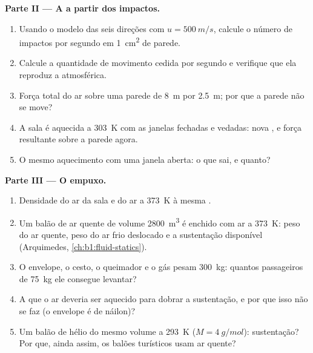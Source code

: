 \begin{problem}
\medskip
\noindent\textbf{Parte II --- A  a partir dos impactos.}
\begin{enumerate}[resume]
  \item Usando o modelo das seis direções com $u = \qty{500}{m/s}$, calcule
        o número de impactos por segundo em \qty{1}{cm^2} de parede.
  \item Calcule a quantidade de movimento cedida por segundo e verifique
        que ela reproduz a  atmosférica.
  \item Força total do ar sobre uma parede de \qty{8}{m} por \qty{2.5}{m};
        por que a parede não se move?
  \item A sala é aquecida a \qty{303}{K} com as janelas fechadas e vedadas:
        nova , e força resultante sobre a parede agora.
  \item O mesmo aquecimento com uma janela aberta: o que sai, e quanto?
\end{enumerate}

\medskip
\noindent\textbf{Parte III --- O empuxo.}
\begin{enumerate}[resume]
  \item Densidade do ar da sala e do ar a \qty{373}{K} à mesma .
  \item Um balão de ar quente de volume \qty{2800}{m^3} é enchido com ar a
        \qty{373}{K}: peso do ar quente, peso do ar frio deslocado e a
        sustentação disponível (Arquimedes,
        \cref{ch:b1:fluid-statics}).
  \item O envelope, o cesto, o queimador e o gás pesam \qty{300}{kg}:
        quantos passageiros de \qty{75}{kg} ele consegue levantar?
  \item A que  o ar deveria ser aquecido para dobrar a
        sustentação, e por que isso não se faz (o envelope é de náilon)?
  \item Um balão de hélio do mesmo volume a \qty{293}{K}
        ($M = \qty{4}{g/mol}$): sustentação? Por que, ainda assim, os balões
        turísticos usam ar quente?
\end{enumerate}


\end{problem}
